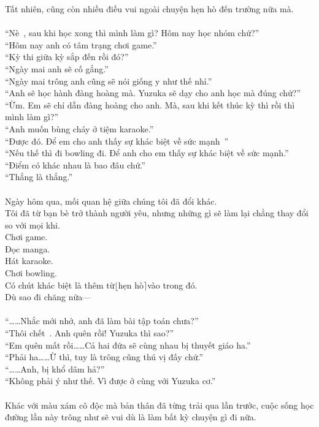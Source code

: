 \documentclass[12pt,a4paper, twosides]{book}
\begin{document}
Tất nhiên, cũng còn nhiều điều vui ngoài chuyện hẹn hò đến trường nữa mà.\\
\\
“Nè~, sau khi học xong thì mình làm gì? Hôm nay học nhóm chứ?”\\
“Hôm nay anh có tâm trạng chơi game.”\\
“Kỳ thi giữa kỳ sắp đến rồi đó?”\\
“Ngày mai anh sẽ cố gắng.”\\
“Ngày mai trông anh cũng sẽ nói giống y như thế nhỉ.”\\
“Anh sẽ học hành đàng hoàng mà. Yuzuka sẽ dạy cho anh học mà đúng chứ?”\\
“Ừm. Em sẽ chỉ dẫn đàng hoàng cho anh. Mà, sau khi kết thúc kỳ thì rồi thì mình làm gì?”\\
“Anh muốn bùng cháy ở tiệm karaoke.”\\
“Được đó. Để em cho anh thấy sự khác biệt về sức mạnh~”\\
“Nếu thế thì đi bowling đi. Để anh cho em thấy sự khác biệt về sức mạnh.”\\
“Điểm có khác nhau là bao đâu chứ.”\\
“Thắng là thắng.”\\
\\
Ngày hôm qua, mối quan hệ giữa chúng tôi đã đổi khác.\\
Tôi đã từ bạn bè trở thành người yêu, nhưng những gì sẽ làm lại chẳng thay đổi so với mọi khi.\\
Chơi game.\\
Đọc manga.\\
Hát karaoke.\\
Chơi bowling.\\
Có chút khác biệt là thêm từ$\lfloor$hẹn hò$\rceil$vào trong đó.\\
Dù sao đi chăng nữa—\\
\\
“……Nhắc mới nhớ, anh đã làm bài tập toán chưa?”\\
“Thôi chết~. Anh quên rồi! Yuzuka thì sao?”\\
“Em quên mất rồi……Cả hai đứa sẽ cùng nhau bị thuyết giáo ha.”\\
“Phải ha……Ừ thì, tuy là trông cũng thú vị đấy chứ.”\\
“……Anh, bị khổ dâm hả?”\\
“Không phải ý như thế. Vì được ở cùng với Yuzuka cơ.”\\
\\
Khác với màu xám cô độc mà bản thân đã từng trải qua lần trước, cuộc sống học đường lần này trông như sẽ vui dù là làm bất kỳ chuyện gì đi nữa.\\
\end{document}
